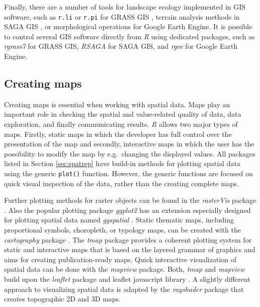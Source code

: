 \documentclass[smallextended]{svjour3}       %
\begin{document}
Finally, there are a number of tools for landscape ecology implemented in GIS software, such as \texttt{r.li} or \texttt{r.pi} for GRASS GIS \cite{wegmann2018r,neteler2012grass,Porta2017}, terrain analysis methods in SAGA GIS \cite{gmd-8-1991-2015}, or morphological operations for Google Earth Engine.
It is possible to control several GIS software directly from \emph{R} using dedicated packages, such as \emph{rgrass7} \cite{R-grass7} for GRASS GIS, \emph{RSAGA} \cite{R-RSAGA} for SAGA GIS, and \emph{rgee} \cite{R-rgee} for Google Earth Engine.

\hypertarget{creating-maps}{%
\subsection{Creating maps}\label{creating-maps}}

Creating maps is essential when working with spatial data.
Maps play an important role in checking the spatial and value-related quality of data, data exploration, and finally communicating results.
\emph{R} allows two major types of maps.
Firstly, static maps in which the developer has full control over the presentation of the map and secondly, interactive maps in which the user has the possibility to modify the map by e.g.~changing the displayed values.
All packages listed in Section \ref{sec:spatrep} have build-in methods for plotting spatial data using the generic \texttt{plot()} function.
However, the generic functions are focused on quick visual inspection of the data, rather than the creating complete maps.

Further plotting methods for raster objects can be found in the \emph{rasterVis} package \cite{Lamigueiro2020}.
Also the popular plotting package \emph{ggplot2} \cite{Wickham2016a} has an extension especially designed for plotting spatial data named \emph{ggspatial} \cite{R-ggspatial}.
Static thematic maps, including proportional symbols, choropleth, or typology maps, can be created with the \emph{cartography} package \cite{Giraud2016}.
The \emph{tmap} package provides a coherent plotting system for static and interactive maps that is based on the layered grammar of graphics \cite{Tennekes2018} and aims for creating publication-ready maps.
Quick interactive visualization of spatial data can be done with the \emph{mapview} package\cite{R-mapview}.
Both, \emph{tmap} and \emph{mapview} build upon the \emph{leaflet} package and leaflet javascript library \cite{R-leaflet}.
A slightly different approach to visualizing spatial data is adapted by the \emph{rayshader} package \cite{Morgen-Wall2020} that creates topographic 2D and 3D maps.
\end{document}
